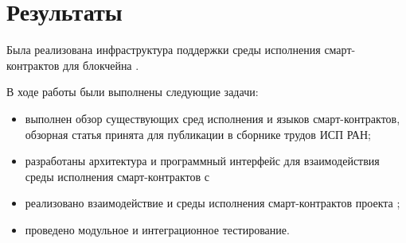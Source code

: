 \section{Результаты}
Была реализована инфраструктура поддержки среды исполнения смарт-контрактов для блокчейна .

В ходе работы были выполнены следующие задачи:
\begin{itemize}
    \item выполнен обзор существующих сред исполнения и языков смарт-контрактов, обзорная статья принята для публикации в сборнике трудов ИСП РАН;
    \item разработаны архитектура и программный интерфейс для взаимодействия среды исполнения смарт-контрактов с 
    \item реализовано взаимодействие  и среды исполнения смарт-контрактов проекта ;
    \item проведено модульное и интеграционное тестирование.
\end{itemize}
